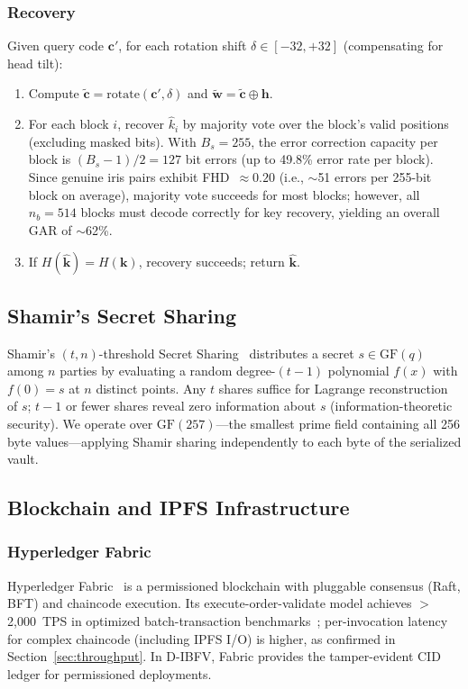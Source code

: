 \documentclass[3p,twocolumn]{elsarticle}
\newcommand{\DIBFV}{\textsf{D-IBFV}}
\begin{document}
\subsubsection{Recovery}
Given query code $\mathbf{c}'$, for each rotation shift $\delta \in [-32, +32]$ (compensating for head tilt):
\begin{enumerate}
    \item Compute $\tilde{\mathbf{c}} = \text{rotate}(\mathbf{c}', \delta)$ and $\tilde{\mathbf{w}} = \tilde{\mathbf{c}} \oplus \mathbf{h}$.
    \item For each block $i$, recover $\hat{k}_i$ by majority vote over the block's valid positions (excluding masked bits). With $B_s = 255$, the error correction capacity per block is $(B_s - 1)/2 = 127$ bit errors (up to 49.8\% error rate per block). Since genuine iris pairs exhibit FHD~$\approx 0.20$ (i.e., $\sim$51 errors per 255-bit block on average), majority vote succeeds for most blocks; however, all $n_b = 514$ blocks must decode correctly for key recovery, yielding an overall GAR of $\sim$62\%.
    \item If $H(\hat{\mathbf{k}}) = H(\mathbf{k})$, recovery succeeds; return $\hat{\mathbf{k}}$.
\end{enumerate}

\subsection{Shamir's Secret Sharing}
\label{sec:shamir_background}

Shamir's $(t,n)$-threshold Secret Sharing~\cite{shamir1979how} distributes a secret $s \in \mathrm{GF}(q)$ among $n$ parties by evaluating a random degree-$(t{-}1)$ polynomial $f(x)$ with $f(0) = s$ at $n$ distinct points. Any $t$ shares suffice for Lagrange reconstruction of $s$; $t{-}1$ or fewer shares reveal zero information about $s$ (information-theoretic security). We operate over $\mathrm{GF}(257)$---the smallest prime field containing all 256 byte values---applying Shamir sharing independently to each byte of the serialized vault.

\subsection{Blockchain and IPFS Infrastructure}
\label{sec:blockchain_background}

\subsubsection{Hyperledger Fabric}
Hyperledger Fabric~\cite{androulaki2018hyperledger} is a permissioned blockchain with pluggable consensus (Raft, BFT) and chaincode execution. Its execute-order-validate model achieves $>$2{,}000~TPS in optimized batch-transaction benchmarks~\cite{androulaki2018hyperledger}; per-invocation latency for complex chaincode (including IPFS I/O) is higher, as confirmed in Section~\ref{sec:throughput}. In \DIBFV{}, Fabric provides the tamper-evident CID ledger for permissioned deployments.
\end{document}
